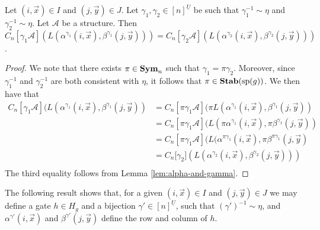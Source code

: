 \documentclass[../paper.tex]{subfiles}
\begin{document}
\begin{lem}
  \label{lem:alpha-ind-gamma}
  Let $(i,\vec{x}) \in I$ and $(j, \vec{y}) \in J$. Let $\gamma_1, \gamma_2 \in
  [n]^{\underline{U}}$ be such that $\gamma^{-1}_1 \sim \eta$ and $\gamma^{-1}_2
  \sim \eta$. Let $\mathcal{A}$ be a structure. Then $C_n[\gamma_1 \mathcal{A}]
  (L(\alpha^{\gamma_1}(i, \vec{x}), \beta^{\gamma_1}(j, \vec{y}))) =
  C_n[\gamma_2 \mathcal{A}] (L(\alpha^{\gamma_2}(i, \vec{x}),
  \beta^{\gamma_2}(j, \vec{y})))$.
\end{lem}
\begin{proof}
  We note that there exists $\pi \in \text{\textbf{Sym}}_n$ such that $\gamma_1 = \pi
  \gamma_2$. Moreover, since $\gamma^{-1}_1$ and $\gamma^{-1}_2$ are both
  consistent with $\eta$, it follows that $\pi \in \text{\textbf{Stab}} (\text{sp} (g))$. We then have
  that
  \begin{align*}
    C_n[\gamma_1 \mathcal{A}](L(\alpha^{\gamma_1}(i, \vec{x}), \beta^{\gamma_1}(j,
    \vec{y})) &= C_n[\pi \gamma_1 \mathcal{A}](\pi L(\alpha^{\gamma_1}(i, \vec{x}),
                \beta^{\gamma_1}(j, \vec{y})) \\
              &= C_n[\pi \gamma_1 \mathcal{A}](L(\pi
                \alpha^{\gamma_1}(i, \vec{x}), \pi \beta^{\gamma_1}(j, \vec{y}))\\
              &= C_n[\pi
                \gamma_1 \mathcal{A}](L(\alpha^{\pi \gamma_1}(i, \vec{x}), \pi \beta^{\pi
                \gamma_1}(j, \vec{y})\\
              &= C_n[\gamma_2 \mathcal] (L(\alpha^{\gamma_2}(i,
                \vec{x}), \beta^{\gamma_2}(j, \vec{y})))\\
  \end{align*}The third equality follows from Lemma \ref{lem:alpha-and-gamma}.
\end{proof}

The following result shows that, for a given $(i, \vec{x}) \in I$ and $(j,
\vec{y}) \in J$ we may define a gate $h \in H_g$ and a bijection $\gamma' \in
[n]^{\underline{U}}$, such that $(\gamma')^{-1} \sim \eta$, and
$\alpha^{\gamma'}(i, \vec{x})$ and $\beta^{\gamma'}(j, \vec{y})$ define the row
and column of $h$.
\end{document}
